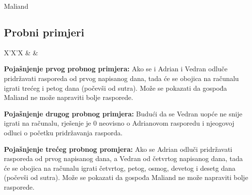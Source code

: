\begin{statement}[
  problempoints=100,
  timelimit=2 sekunde,
  memorylimit=512 MiB,
]{Maliand}
\subsection*{Probni primjeri}
\begin{tabularx}{\textwidth}{X'X'X}
 &
 &
\end{tabularx}

\textbf{Pojašnjenje prvog probnog primjera:} Ako se i Adrian i Vedran odluče
pridržavati rasporeda od prvog napisanog dana, tada će se obojica na računalu
igrati trećeg i petog dana (počevši od sutra). Može se pokazati da gospođa
Maliand ne može napraviti bolje rasporede.

\textbf{Pojašnjenje drugog probnog primjera:} Budući da se Vedran uopće ne
snije igrati na računalu, rješenje je $0$ neovisno o Adrianovom rasporedu i
njeogovoj odluci o početku pridržavanja rasporda.

\textbf{Pojašnjenje trećeg probnog promjera:} Ako se Adrian odluči pridržavati
rasporeda od prvog napisanog dana, a Vedran od četvrtog napisanog dana, tada će
se obojica na računalu igrati četvrtog, petog, osmog, devetog i desetg dana
(počevši od sutra). Može se pokazati da gospođa Maliand ne može napraviti bolje
rasporede.


\end{statement}

